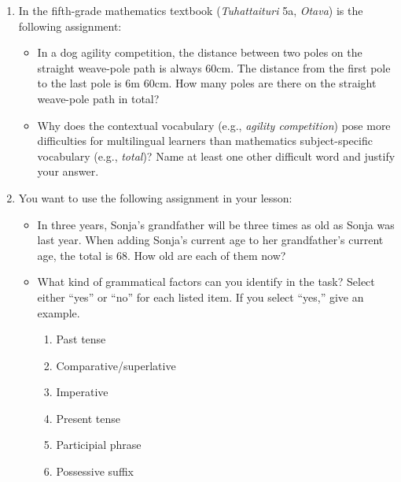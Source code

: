 \documentclass[output=paper]{langscibook}
\begin{document}
\begin{enumerate}[label=\Alph*.]
\item In the fifth-grade mathematics textbook (\emph{Tuhattaituri} 5a, \emph{Otava}) is the following assignment:

\begin{itemize}
\item In a dog agility competition, the distance between two poles on the straight weave\hyp pole path is always 60cm. The distance from the first pole to the last pole is 6m 60cm. How many poles are there on the straight weave-pole path in total?

\item Why does the contextual vocabulary (e.g., \emph{agility competition}) pose more difficulties for multilingual learners than mathematics subject-specific vocabulary (e.g., \emph{total})? Name at least one other difficult word and justify your answer.
\end{itemize}

\item You want to use the following assignment in your lesson:

\begin{itemize}
\item In three years, Sonja’s grandfather will be three times as old as Sonja was last year. When adding Sonja’s current age to her grandfather’s current age, the total is 68. How old are each of them now?

\item What kind of grammatical factors can you identify in the task? Select either “yes” or “no” for each listed item. If you select “yes,” give an example.

\begin{enumerate}
\item Past tense
\item Comparative/superlative
\item Imperative
\item Present tense
\item Participial phrase 
\item Possessive suffix
\end{enumerate}
\end{itemize}
\end{enumerate}

\label{appendix:alisaari2}
\end{document}
